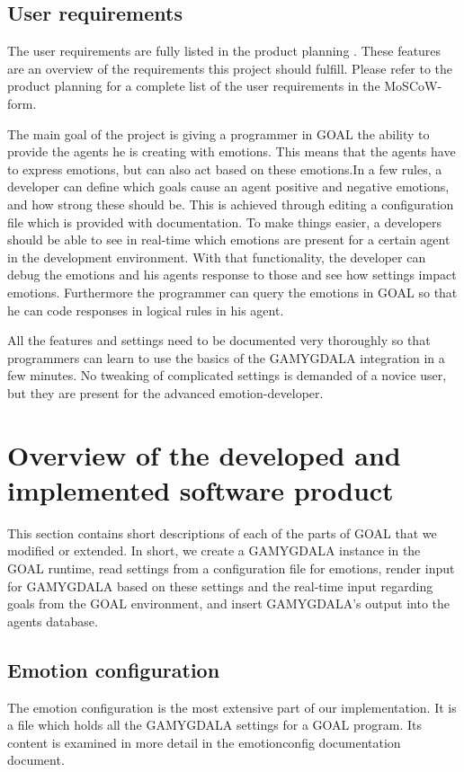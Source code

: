 \documentclass[11pt]{article}
\begin{document}
\subsection{User requirements}
The user requirements are fully listed in the product planning \cite{productplan}. These features are an overview of the requirements this project should fulfill. Please refer to the product planning for a complete list of the user requirements in the \gls{MoSCoW}-form.\cite{MoSCoW}\par
The main goal of the project is giving a programmer in GOAL the ability to provide the agents he is creating with emotions. This means that the agents have to express emotions, but can also act based on these emotions.In a few rules, a developer can define which goals cause an agent positive and negative emotions, and how strong these should be. This is achieved through editing a configuration file which is provided with documentation. To make things easier, a developers should be able to see in real-time which emotions are present for a certain agent in the development environment. With that functionality, the developer can debug the emotions and his agents response to those and see how settings impact emotions. Furthermore the programmer can query the emotions in GOAL so that he can code responses in logical rules in his agent. \par All the features and settings need to be documented very thoroughly so that programmers can learn to use the basics of the GAMYGDALA integration in a few minutes. No tweaking of complicated settings is demanded of a novice user, but they are present for the advanced emotion-developer.


\section{Overview of the developed and implemented software product}
This section contains short descriptions of each of the parts of GOAL\cite{GOAL Env} that we modified or extended. In short, we create a GAMYGDALA instance in the GOAL runtime, read settings from a configuration file for emotions, render input for GAMYGDALA based on these settings and the real-time input regarding goals from the GOAL environment, and insert GAMYGDALA's output into the agents database.

\subsection{Emotion configuration}
The emotion configuration is the most extensive part of our implementation. It is a file which holds all the GAMYGDALA settings for a GOAL program. Its content is examined in more detail in the emotionconfig documentation document.
\end{document}

